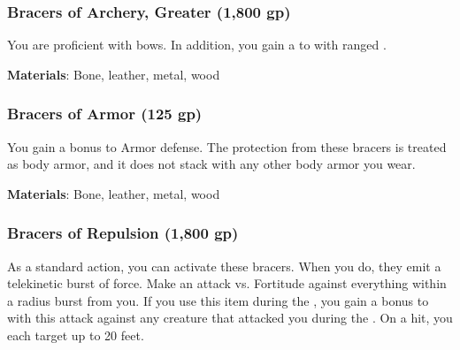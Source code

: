 \lowercase{\hypertarget{item:Bracers of Archery, Greater}{}}\label{item:Bracers of Archery, Greater}
\hypertarget{item:Bracers of Archery, Greater}{\subsubsection{Bracers of Archery, Greater\hfill{} (1,800 gp)}}

You are proficient with bows.
In addition, you gain a   to  with ranged .



\vspace{0.25em}
\textbf{Materials}: Bone, leather, metal, wood


\lowercase{\hypertarget{item:Bracers of Armor}{}}\label{item:Bracers of Armor}
\hypertarget{item:Bracers of Armor}{\subsubsection{Bracers of Armor\hfill{} (125 gp)}}

You gain a  bonus to Armor defense.
The protection from these bracers is treated as body armor, and it does not stack with any other body armor you wear.



\vspace{0.25em}
\textbf{Materials}: Bone, leather, metal, wood


\lowercase{\hypertarget{item:Bracers of Repulsion}{}}\label{item:Bracers of Repulsion}
\hypertarget{item:Bracers of Repulsion}{\subsubsection{Bracers of Repulsion\hfill{} (1,800 gp)}}

As a standard action, you can activate these bracers.
When you do, they emit a telekinetic burst of force.
Make an attack vs. Fortitude against everything within a \areasmall radius burst from you.
If you use this item during the ,
you gain a  bonus to  with this attack against any creature that attacked you during the .
On a hit, you  each target up to 20 feet.



